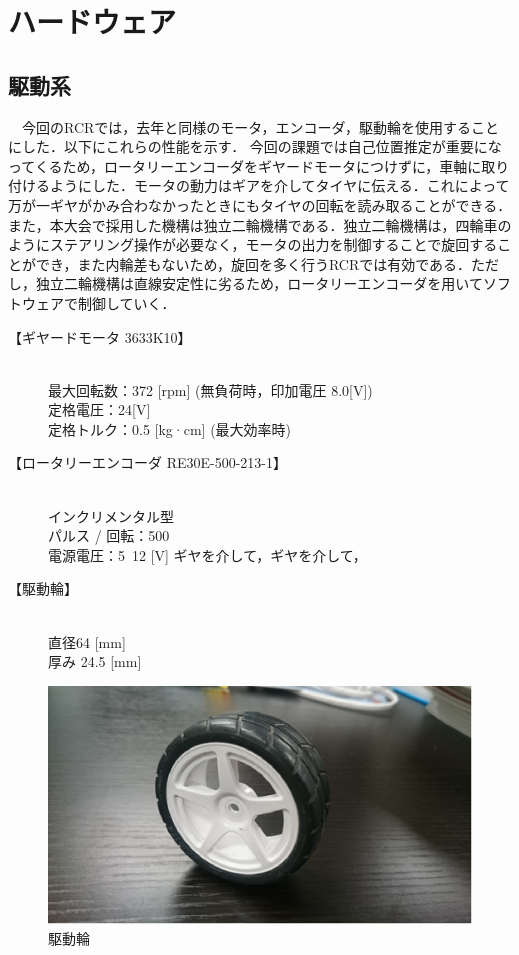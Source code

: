 \section{ハードウェア}
\subsection{駆動系}
　今回のRCRでは，去年と同様のモータ，エンコーダ，駆動輪を使用することにした．以下にこれらの性能を示す．
今回の課題では自己位置推定が重要になってくるため，ロータリーエンコーダをギヤードモータにつけずに，車軸に取り付けるようにした．モータの動力はギアを介してタイヤに伝える．これによって万が一ギヤがかみ合わなかったときにもタイヤの回転を読み取ることができる．
また，本大会で採用した機構は独立二輪機構である．独立二輪機構は，四輪車のようにステアリング操作が必要なく，モータの出力を制御することで旋回することができ，また内輪差もないため，旋回を多く行うRCRでは有効である．ただし，独立二輪機構は直線安定性に劣るため，ロータリーエンコーダを用いてソフトウェアで制御していく．

\begin{description}
 \item[【ギヤードモータ 3633K10】] \mbox{} \\ 
	    最大回転数：372 [rpm] (無負荷時，印加電圧 8.0[V]) \\
	    定格電圧：24[V] \\
	    定格トルク：0.5 [kg·cm] (最大効率時)        
 \item[【ロータリーエンコーダ RE30E-500-213-1】] \mbox{} \\
	    インクリメンタル型 \\
	    パルス / 回転：500 \\
	    電源電圧：5~12 [V] ギヤを介して，ギヤを介して，
 \item[【駆動輪】] \mbox{} \\
	    直径64 [mm] \\
	    厚み 24.5 [mm]
\end{description}


\begin{figure}[b]
 \begin{center}
  \includegraphics[scale=.5]{../kuwano/picture/picture1.eps}
  \caption{駆動輪}
 \end{center}
\end{figure}


